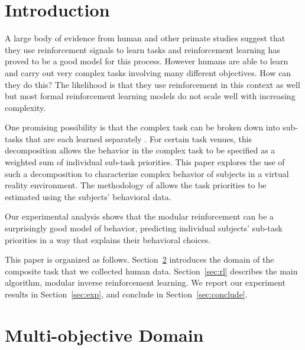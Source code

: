 \section{Introduction}

A large body of evidence from human and other primate studies 
suggest that they use reinforcement signals to learn tasks and reinforcement 
learning has proved to be a good model for this process.
However humans are able to learn and carry out very complex tasks involving 
many different objectives. 
How can they do this? The likelihood is that they use reinforcement in this 
context as well but most formal reinforcement learning models do not scale 
well with increasing complexity.

One promising possibility is that the complex task can be broken down into 
sub-tasks that are each learned separately \cite{sprague2003multiple,
rothkopf2013modular, dietterich2000hierarchical}. 
For certain task venues, this decomposition allows the behavior in the complex 
task to be specified as a weighted sum of individual sub-task priorities.
This paper explores the use of such a decomposition to characterize complex
behavior of subjects in a virtual reality environment. The methodology of
\cite{rothkopf2013modular} allows the task priorities to be estimated using the
subjects' behavioral data.

Our experimental analysis shows that the modular reinforcement can be a 
surprisingly good model of behavior, predicting individual subjects' sub-task 
priorities in a way that explains their behavioral choices.

This paper is organized as follows. Section~\ref{sec:domain} introduces the
domain of the composite task that we collected human data. Section~\ref{sec:rl}
describes the main algorithm, modular inverse reinforcement learning. We report
our experiment results in Section~\ref{sec:exp}, and conclude in
Section~\ref{sec:conclude}.

\section{Multi-objective Domain}
\label{sec:domain}

